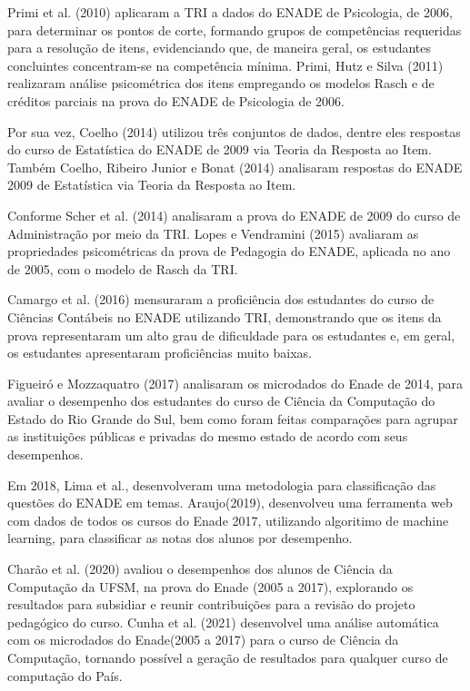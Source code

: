 \documentclass[12pt]{article}
\begin{document}
Primi et al. (2010) aplicaram a TRI a dados do ENADE de Psicologia, de 2006, para determinar os pontos de corte, formando grupos de competências requeridas para a resolução de itens, evidenciando que, de maneira geral, os estudantes concluintes concentram-se na competência mínima. Primi, Hutz e Silva (2011) realizaram análise psicométrica dos itens empregando os modelos Rasch e de créditos parciais na prova do ENADE de Psicologia de 2006.

Por sua vez, Coelho (2014) utilizou três conjuntos de dados, dentre eles respostas do curso de Estatística do ENADE de 2009 via Teoria da Resposta ao Item. Também Coelho, Ribeiro Junior e Bonat (2014) analisaram respostas do ENADE 2009 de Estatística via Teoria da Resposta ao Item.

\newpage
Conforme Scher et al. (2014) analisaram a prova do ENADE de 2009 do curso de Administração por meio da TRI. Lopes e Vendramini (2015) avaliaram as propriedades psicométricas da prova de Pedagogia do ENADE, aplicada no ano de 2005, com o modelo de Rasch da TRI.

Camargo et al. (2016) mensuraram a proficiência dos estudantes do curso de Ciências Contábeis no ENADE utilizando TRI, demonstrando que os itens da prova representaram um alto grau de dificuldade para os estudantes e, em geral, os estudantes apresentaram proficiências muito baixas.

Figueiró e Mozzaquatro (2017) analisaram os microdados do Enade de 2014, para avaliar o desempenho dos estudantes do curso de Ciência da
Computação do Estado do Rio Grande do Sul, bem como foram feitas comparações para
agrupar as instituições públicas e privadas do mesmo estado de acordo com seus
desempenhos.


Em 2018, Lima et al., desenvolveram uma metodologia para classificação das questões do ENADE em temas. Araujo(2019), desenvolveu uma ferramenta web com dados de todos os cursos do Enade 2017, utilizando algoritimo de machine learning, para classificar as notas dos alunos por desempenho.

Charão et al. (2020) avaliou o desempenhos dos alunos de Ciência da Computação da UFSM, na prova do Enade (2005 a 2017), explorando os resultados para subsidiar e reunir contribuições para a revisão do projeto pedagógico do curso. Cunha et al. (2021) desenvolvel uma análise automática com os microdados do Enade(2005 a 2017) para o curso de Ciência da Computação, tornando possível a geração de resultados para qualquer curso de computação do País.
\vskip0.3cm
\end{document}
